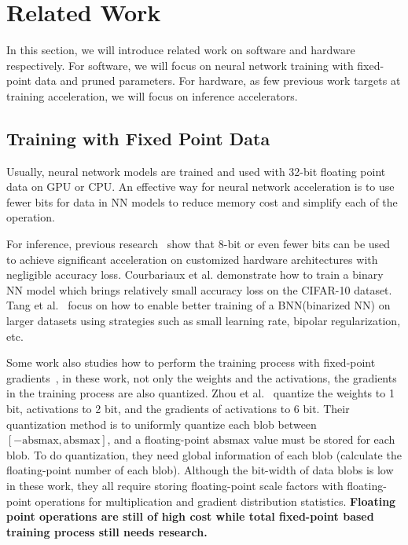 \section{Related Work}\label{sec:related_work}
In this section, we will introduce related work on software and hardware respectively. For software, we will focus on neural network training with fixed-point data and pruned parameters. For hardware, as few previous work targets at training acceleration, we will focus on inference accelerators.

\subsection{Training with Fixed Point Data}
Usually, neural network models are trained and used with 32-bit floating point data on GPU or CPU. An effective way for neural network acceleration is to use fewer bits for data in NN models to reduce memory cost and simplify each of the operation.

For inference, previous research~\cite{han2016eie,qiu2016going} show that 8-bit or even fewer bits can be used to achieve significant acceleration on customized hardware architectures with negligible accuracy loss. Courbariaux et al.\cite{hubara2016binarized} demonstrate how to train a binary NN model which brings relatively small accuracy loss on the CIFAR-10 dataset. Tang et al.~\cite{tang2017train} focus on how to enable better training of a BNN(binarized NN) on larger datasets using strategies such as small learning rate, bipolar regularization, etc.

Some work also studies how to perform the training process with fixed-point gradients~\cite{hubara2016binarized, hubara2017quantized, zhou2016dorefa}, in these work, not only the weights and the activations, the gradients in the training process are also quantized. Zhou et al.~\cite{zhou2016dorefa} quantize the weights to 1 bit, activations to 2 bit, and the gradients of activations to 6 bit. Their quantization method is to uniformly quantize each blob between $[-\mbox{absmax}, \mbox{absmax}]$, and a floating-point $\mbox{absmax}$ value must be stored for each blob. To do quantization, they need global information of each blob (calculate the floating-point number of each blob). Although the bit-width of data blobs is low in these work, they all require storing floating-point scale factors with floating-point operations for multiplication and gradient distribution statistics. {\bf{Floating point operations are still of high cost while total fixed-point based training process still needs research.}}


